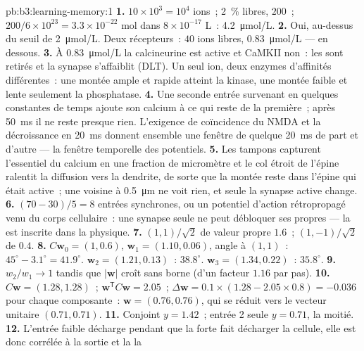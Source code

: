 \begin{solution}{pb:b3:learning-memory:1}
\textbf{1.} $10\times 10^{3} = 10^{4}$ ions~; \qty{2}{\%} libres, $200$~;
$200/6\times 10^{23} = 3.3\times 10^{-22}$ mol dans $8\times 10^{-17}$ L~:
\qty{4.2}{\micro mol/L}.
\textbf{2.} Oui, au-dessus du seuil de \qty{2}{\micro mol/L}. Deux
récepteurs~: $40$ ions libres, \qty{0.83}{\micro mol/L} --- en dessous.
\textbf{3.} À \qty{0.83}{\micro mol/L} la calcineurine est active et
CaMKII non~: les  sont retirés et la synapse s'affaiblit
(DLT). Un seul ion, deux enzymes d'affinités différentes~: une montée
ample et rapide atteint la kinase, une montée faible et lente seulement
la phosphatase.
\textbf{4.} Une seconde entrée survenant en quelques constantes de temps
ajoute son calcium à ce qui reste de la première~; après \qty{50}{ms} il
ne reste presque rien. L'exigence de coïncidence du NMDA et la
décroissance en \qty{20}{ms} donnent ensemble une fenêtre de quelque
\qty{20}{ms} de part et d'autre --- la fenêtre temporelle des potentiels.
\textbf{5.} Les tampons capturent l'essentiel du calcium en une fraction
de micromètre et le col étroit de l'épine ralentit la diffusion vers la
dendrite, de sorte que la montée reste dans l'épine qui était active~;
une voisine à \qty{0.5}{\micro m} ne voit rien, et seule la synapse
active change.
\textbf{6.} $(70 - 30)/5 = 8$ entrées synchrones, ou un potentiel
d'action rétropropagé venu du corps cellulaire~: une synapse seule ne
peut débloquer ses propres  --- la  est
inscrite dans la physique.
\textbf{7.} $(1,1)/\sqrt{2}$ de valeur propre $1.6$~; $(1,-1)/\sqrt{2}$
de $0.4$.
\textbf{8.} $C\mathbf{w}_{0} = (1, 0.6)$, $\mathbf{w}_{1} = (1.10,
0.06)$, angle à $(1,1)$~: $45^{\circ} - 3.1^{\circ} = 41.9^{\circ}$.
$\mathbf{w}_{2} = (1.21, 0.13)$~: $38.8^{\circ}$. $\mathbf{w}_{3} = (1.34,
0.22)$~: $35.8^{\circ}$.
\textbf{9.} $w_{2}/w_{1} \to 1$ tandis que $|\mathbf{w}|$ croît sans
borne (d'un facteur $1.16$ par pas).
\textbf{10.} $C\mathbf{w} = (1.28, 1.28)$~; $\mathbf{w}^{\mathsf{T}}C
\mathbf{w} = 2.05$~; $\Delta\mathbf{w} = 0.1\times(1.28 - 2.05\times 0.8)
= -0.036$ pour chaque composante~: $\mathbf{w} = (0.76, 0.76)$, qui se
réduit vers le vecteur unitaire $(0.71, 0.71)$.
\textbf{11.} Conjoint $y = 1.42$~; entrée 2 seule $y = 0.71$, la moitié.
\textbf{12.} L'entrée faible décharge pendant que la forte fait décharger
la cellule, elle est donc corrélée à la sortie et la  la

\end{solution}
